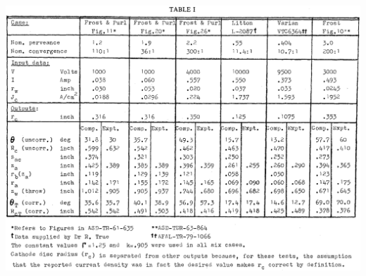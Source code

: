 \documentclass[10pt,a4paper,UTF8,fleqn]{article}
\begin{document}
\begin{table}[phtb]
	\centering
	\includegraphics[width=0.9\linewidth]{figure/tab1}
	\label{tab1}
\end{table}
\end{document}
